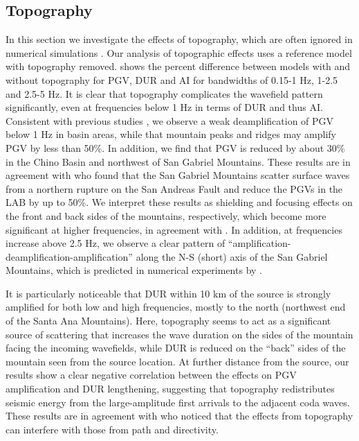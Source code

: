 \subsection{Topography}
In this section we investigate the effects of topography, which are often ignored in numerical simulations . Our analysis of topographic effects uses a reference model with topography removed.
 shows the percent difference between models with and without topography for PGV, DUR and AI for bandwidths of 0.15-1 Hz, 1-2.5 and 2.5-5 Hz. It is clear that topography complicates the wavefield pattern significantly, even at frequencies below 1 Hz in terms of DUR and thus AI. Consistent with previous studies , we observe a weak deamplification of PGV below 1 Hz in basin areas, while that mountain peaks and ridges may amplify PGV by less than 50\%. In addition, we find that PGV is reduced by about 30\% in the Chino Basin and northwest of San Gabriel Mountains. These results are in agreement with \citet{maEffectsLargeScaleSurface2007} who found that the San Gabriel Mountains scatter surface waves from a northern rupture on the San Andreas Fault and reduce the PGVs in the LAB by up to 50\%. We interpret these results as shielding and focusing effects on the front and back sides of the mountains, respectively, which become more significant at higher frequencies, in agreement with \citet{liuScatteringSeismicWaves2020}. In addition, at frequencies increase above 2.5 Hz, we observe a clear pattern of “amplification-deamplification-amplification” along the N-S (short) axis of the San Gabriel Mountains, which is predicted in numerical experiments by \citet{liuScatteringSeismicWaves2020}.

It is particularly noticeable that DUR within 10 km of the source is strongly amplified for both low and high frequencies, mostly to the north (northwest end of the Santa Ana Mountains). Here, topography seems to act as a significant source of scattering that increases the wave duration on the sides of the mountain facing the incoming wavefields, while DUR is reduced on the ``back'' sides of the mountain seen from the source location. At further distance from the source, our results show a clear negative correlation between the effects on PGV amplification and DUR lengthening, suggesting that topography redistributes seismic energy from the large-amplitude first arrivals to the adjacent coda waves. These results are in agreement with \citet{leeEffectsRealisticSurface2009} who noticed that the effects from topography can interfere with those from path and directivity.




